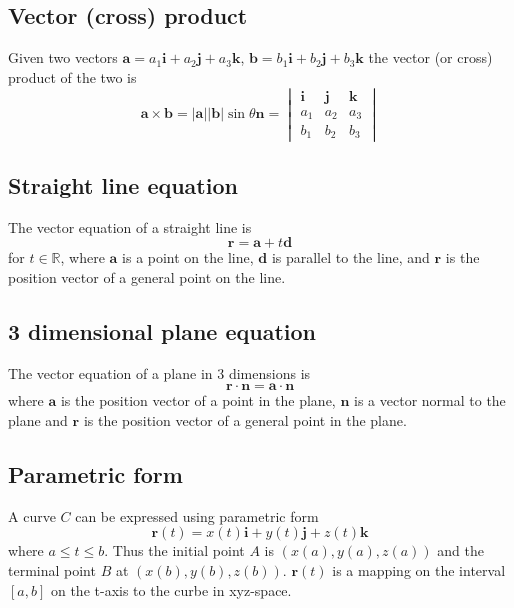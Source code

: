\documentclass[12pt]{article}
\begin{document}
	\subsection{Vector (cross) product}
	\begin{defn}
		Given two vectors $\mathbf{a} = a_1 \mathbf{i} + a_2 \mathbf{j} + a_3 \mathbf{k}$,
		$\mathbf{b} = b_1 \mathbf{i} + b_2 \mathbf{j} + b_3 \mathbf{k}$ the vector (or cross) product of the two is
		\[
			\mathbf{a} \times \mathbf{b} = |\mathbf{a}||\mathbf{b}|\sin{\theta}\mathbf{n} =
			\begin{vmatrix}
				\mathbf{i} & \mathbf{j} & \mathbf{k} \\
				a_1 & a_2 & a_3 \\
				b_1 & b_2 & b_3 
			\end{vmatrix} 
		\]
	\end{defn}
	
	\subsection{Straight line equation}
	\begin{defn}
		The vector equation of a straight line is
		\[
			\mathbf{r} = \mathbf{a} + t \mathbf{d}
		\]
		for $t \in \mathbb{R}$, where $\mathbf{a}$ is a point on the line, $\mathbf{d}$ is parallel to the line, 
		and $\mathbf{r}$ is the position vector of a general point on the line.
	\end{defn}
	
	\subsection{3 dimensional plane equation}
	\begin{defn}
		The vector equation of a plane in 3 dimensions is
		\[
			\mathbf{r} \cdot \mathbf{n} = \mathbf{a} \cdot \mathbf{n}
		\]
		where $\mathbf{a}$ is the position vector of a point in the plane, $\mathbf{n}$ is a vector normal to
		the plane and $\mathbf{r}$ is the position vector of a general point in the plane.
	\end{defn}
	
	\subsection{Parametric form}
	A curve $C$ can be expressed using parametric form
	\[
		\mathbf{r}(t) = x(t)\mathbf{i} + y(t)\mathbf{j} + z(t)\mathbf{k}
	\]
	where $a \leq t \leq b$. Thus the initial point $A$ is $(x(a),y(a),z(a))$ and the terminal point $B$ at $(x(b),y(b),z(b))$.
	$\mathbf{r}(t)$ is a mapping on the interval $[a,b]$ on the t-axis to the curbe in xyz-space.
	
\end{document}
